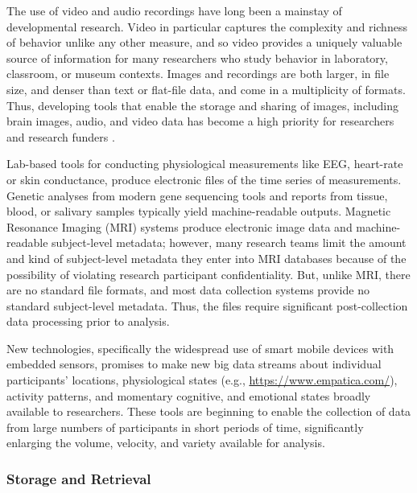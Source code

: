 \documentclass[letterpaper,man,apacite]{apa6}
\begin{document}
The use of video and audio recordings have long been a mainstay of developmental research.
Video in particular captures the complexity and richness of behavior unlike any other measure, and so video provides a uniquely valuable source of information for many researchers who study behavior in laboratory, classroom, or museum contexts. 
Images and recordings are both larger, in file size, and denser than text or flat-file data, and come in a multiplicity of formats. 
Thus, developing tools that enable the storage and sharing of images, including brain images, audio, and video data has become a high priority for researchers and research funders . 

Lab-based tools for conducting physiological measurements like EEG, heart-rate or skin conductance, produce electronic files of the time series of measurements.
Genetic analyses from modern gene sequencing tools and reports from tissue, blood, or salivary samples typically yield machine-readable outputs.
Magnetic Resonance Imaging (MRI) systems produce electronic image data and machine-readable subject-level metadata; however, many research teams limit the amount and kind of subject-level metadata they enter into MRI databases because of the possibility of violating research participant confidentiality.
But, unlike MRI, there are no standard file formats, and most data collection systems provide no standard subject-level metadata.
Thus, the files require significant post-collection data processing prior to analysis. 

New technologies, specifically the widespread use of smart mobile devices with embedded sensors, promises to make new big data streams about individual participants' locations, physiological states (e.g., \url{https://www.empatica.com/}), activity patterns, and momentary cognitive, and emotional states broadly available to researchers.
These tools are beginning to enable the collection of data from large numbers of participants in short periods of time, significantly enlarging the volume, velocity, and variety available for analysis.   

\subsubsection{Storage and Retrieval}
\end{document}
